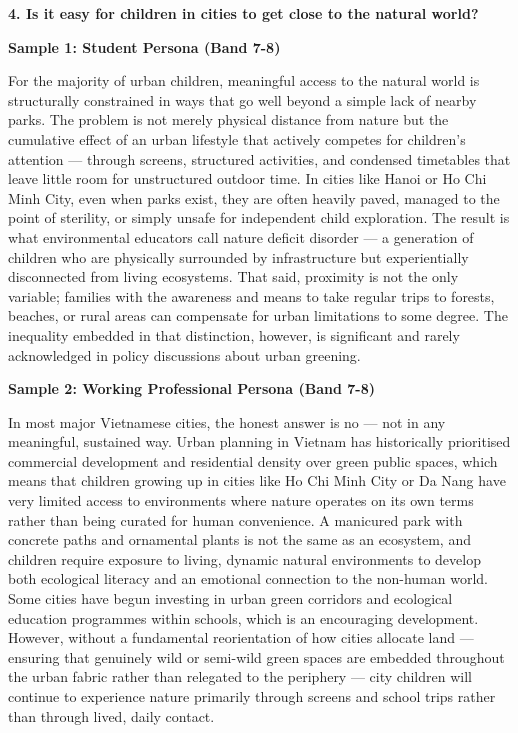 \begin{ieltsquestion}
\textbf{4. Is it easy for children in cities to get close to the natural world?}
\end{ieltsquestion}
\textbf{Sample 1: Student Persona (Band 7-8)}

For the majority of urban children, meaningful access to the natural world is structurally constrained in ways that go well beyond a simple lack of nearby parks. The problem is not merely physical distance from nature but the cumulative effect of an urban lifestyle that actively competes for children's attention — through screens, structured activities, and condensed timetables that leave little room for unstructured outdoor time. In cities like Hanoi or Ho Chi Minh City, even when parks exist, they are often heavily paved, managed to the point of sterility, or simply unsafe for independent child exploration. The result is what environmental educators call nature deficit disorder — a generation of children who are physically surrounded by infrastructure but experientially disconnected from living ecosystems. That said, proximity is not the only variable; families with the awareness and means to take regular trips to forests, beaches, or rural areas can compensate for urban limitations to some degree. The inequality embedded in that distinction, however, is significant and rarely acknowledged in policy discussions about urban greening.

\textbf{Sample 2: Working Professional Persona (Band 7-8)}

In most major Vietnamese cities, the honest answer is no — not in any meaningful, sustained way. Urban planning in Vietnam has historically prioritised commercial development and residential density over green public spaces, which means that children growing up in cities like Ho Chi Minh City or Da Nang have very limited access to environments where nature operates on its own terms rather than being curated for human convenience. A manicured park with concrete paths and ornamental plants is not the same as an ecosystem, and children require exposure to living, dynamic natural environments to develop both ecological literacy and an emotional connection to the non-human world. Some cities have begun investing in urban green corridors and ecological education programmes within schools, which is an encouraging development. However, without a fundamental reorientation of how cities allocate land — ensuring that genuinely wild or semi-wild green spaces are embedded throughout the urban fabric rather than relegated to the periphery — city children will continue to experience nature primarily through screens and school trips rather than through lived, daily contact.

